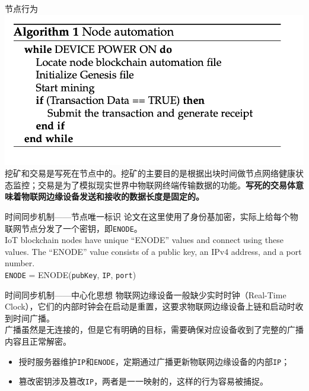 \documentclass{beamer}
\begin{document}
\begin{frame}{节点行为}
	\includegraphics[width=\linewidth]{Assets/算法1}
	挖矿和交易是写死在节点中的。挖矿的主要目的是根据出块时间做节点网络健康状态监控；交易是为了模拟现实世界中物联网终端传输数据的功能。\textbf{写死的交易体意味着物联网边缘设备发送和接收的数据长度是固定的。}
\end{frame}

\begin{frame}{时间同步机制——节点唯一标识}
	论文在这里使用了身份基加密，实际上给每个物联网节点分发了一个密钥，即\texttt{ENODE}。\\
	IoT blockchain nodes have unique “ENODE” values and connect using these values. The “ENODE” value consists of a public key, an IPv4 address, and a port number.\\
	\texttt{ENODE} = ENODE(\texttt{pubKey}, \texttt{IP}, \texttt{port})
\end{frame}

\begin{frame}{时间同步机制——中心化思想}
	物联网边缘设备一般缺少实时时钟（Real-Time Clock），它们的内部时钟会在启动是重置，这要求物联网边缘设备上链和启动时收到时间广播。\\
	广播虽然是无连接的，但是它有明确的目标，需要确保对应设备收到了完整的广播内容且正常解密。
	\begin{itemize}
		\item 授时服务器维护\texttt{IP}和\texttt{ENODE}，定期通过广播更新物联网边缘设备的内部\texttt{IP}；
		\item 篡改密钥涉及篡改\texttt{IP}，两者是一一映射的，这样的行为容易被捕捉。
	\end{itemize}
\end{frame}
\end{document}
